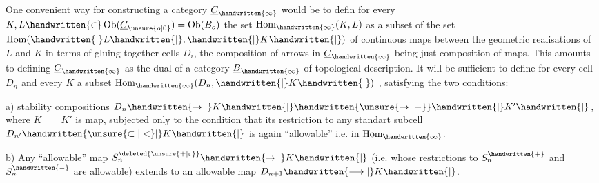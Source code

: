 
 One convenient way for constructing  a category $\underline{C}_{\handwritten{\infty}}$ would be to defin for every $K,L\handwritten{\in}\operatorname{Ob}(\underline{C}_{\unsure{o|0}})=\operatorname{Ob}(B_o)$ the set $\operatorname{Hom}_{\handwritten{\infty}}(K,L)$ as a subset of the set $\operatorname{Hom}(\handwritten{|}L\handwritten{|},\handwritten{|}K\handwritten{|})$ of continuous maps  between the geometric realisations of $L$ and $K$ in terms of gluing together cells $D_i$, the composition of arrows in $\underline{C}_{\handwritten{\infty}}$ being just composition of maps. This amounts to defining $\underline{C}_{\handwritten{\infty}}$ as  the dual of a category $\underline{B}_{\handwritten{\infty}}$ of topological description. It will be sufficient to define for every cell $D_n$ and every $K$ a subset $\operatorname{Hom}_{\handwritten{\infty}}(D_n,\handwritten{|}K\handwritten{|})$ , satisfying the two conditions:

a) stability  compositions $D_n\handwritten{\to|}K\handwritten{|}\handwritten{\unsure{\to|-}} \handwritten{|}K'\handwritten{|}$, where $K\qquad K'$ is  map,  subjected only to the condition that its restriction to any standart subcell $D_{n'}\handwritten{\unsure{\subset|<}|}K\handwritten{|}$ is again ``allowable'' i.e. in $\operatorname{Hom}_{\handwritten{\infty}}$.

b) Any ``allowable'' map $S_n^{\deleted{\unsure{+|\varepsilon}}}\handwritten{\to|}K\handwritten{|}$ (i.e. whose restrictions to $S_n^{\handwritten{+}}$ and $S_n^{\handwritten{-}}$ are allowable) extends to an allowable map $D_{n+1}\handwritten{\longrightarrow|}K\handwritten{|}$.


